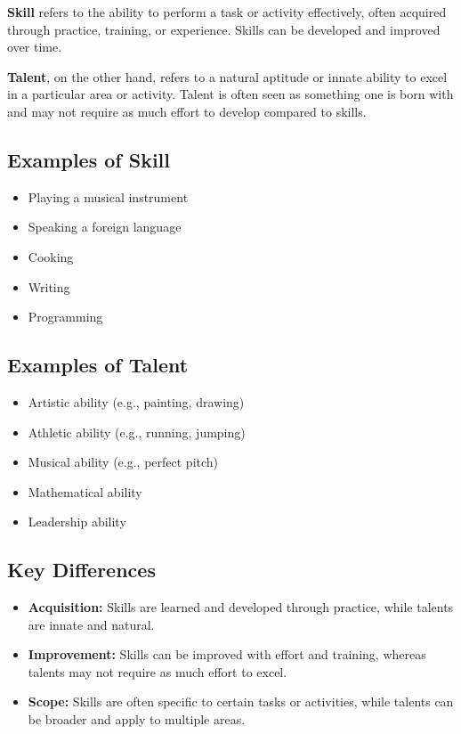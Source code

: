 \textbf{Skill} refers to the ability to perform a task or activity effectively, often acquired through practice, training, or experience. Skills can be developed and improved over time.

\textbf{Talent}, on the other hand, refers to a natural aptitude or innate ability to excel in a particular area or activity. Talent is often seen as something one is born with and may not require as much effort to develop compared to skills.

\subsection{Examples of Skill}
\begin{itemize}
    \item Playing a musical instrument
    \item Speaking a foreign language
    \item Cooking
    \item Writing
    \item Programming
\end{itemize}

\subsection{Examples of Talent}
\begin{itemize}
    \item Artistic ability (e.g., painting, drawing)
    \item Athletic ability (e.g., running, jumping)
    \item Musical ability (e.g., perfect pitch)
    \item Mathematical ability
    \item Leadership ability
\end{itemize}

\subsection{Key Differences}
\begin{itemize}
    \item \textbf{Acquisition:} Skills are learned and developed through practice, while talents are innate and natural.
    \item \textbf{Improvement:} Skills can be improved with effort and training, whereas talents may not require as much effort to excel.
    \item \textbf{Scope:} Skills are often specific to certain tasks or activities, while talents can be broader and apply to multiple areas.
\end{itemize}



